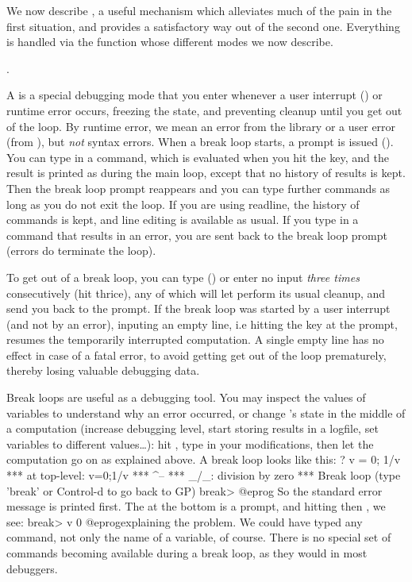 We now describe , a useful mechanism which alleviates
much of the pain in the first situation, and provides a satisfactory way out
of the second one. Everything is handled via the  function whose
different modes we now describe.

.\label{se:breakloop}

A  is a special debugging mode that you enter whenever a
user interrupt () or runtime error occurs, freezing the
 state, and preventing cleanup until you get out of the loop. By
runtime error, we mean an error from the library or a user error (from
), but \emph{not} syntax errors. When a break loop starts, a
prompt is issued (). You can type in a  command, which is
evaluated when you hit the  key, and the result is printed as
during the main  loop, except that no history of results is kept.
Then the break loop prompt reappears and you can type further commands as
long as you do not exit the loop. If you are using readline, the history of
commands is kept, and line editing is available as usual. If you type in a
command that results in an error, you are sent back to the break loop prompt
(errors do  terminate the loop).

To get out of a break loop, you can type 
 () or enter no input \emph{three times} consecutively
(hit  thrice), any of which will let 
perform its usual cleanup, and send you back to the  prompt. If the
break loop was started by a user interrupt (and not by an error),
inputing an empty line, i.e hitting the  key at the
 prompt, resumes the temporarily interrupted computation.
A single empty line has no effect in case of a fatal error, to avoid
getting get out of the loop prematurely, thereby losing valuable debugging
data.

Break loops are useful as a debugging tool. You may inspect the values of
 variables to understand why an error occurred, or change
's state in the middle of a computation (increase debugging level,
start storing results in a logfile, set variables to different values\dots):
hit , type in your modifications, then let the computation go on as
explained above. A break loop looks like this:
\bprog
? v = 0; 1/v
  ***   at top-level: v=0;1/v
  ***                      ^--
  *** _/_: division by zero
  ***   Break loop (type 'break' or Control-d to go back to GP)
break>
@eprog
\noindent So the standard error message is printed first. The
 at the bottom is a prompt, and hitting  then
, we see:
\bprog
break> v
0
@eprog\noindent explaining the problem. We could have typed any 
command, not only the name of a variable, of course. There is no special set
of commands becoming available during a break loop, as they would in most
debuggers.

